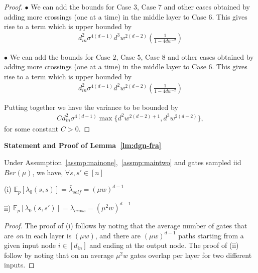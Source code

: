 \begin{proof}
$\bullet$ We can add the bounds for Case $3$, Case $7$ and other cases obtained by adding more crossings (one at a time) in the middle layer to Case $6$. This gives rise to a term which is upper bounded by 
\begin{align*}
d^2_{in}\sigma^{4(d-1)}d^3w^{2(d-2)} \left(\frac{1}{1-4dw^{-2}}\right)
\end{align*}



$\bullet$ We can add the bounds for Case $2$, Case $5$, Case $8$ and other cases obtained by adding more crossings (one at a time) in the middle layer to Case $6$. This gives rise to a term which is upper bounded by 
\begin{align*}
d^2_{in}\sigma^{4(d-1)}d^2w^{2(d-2)} \left(\frac{1}{1-4dw^{-2}}\right)
\end{align*}

Putting together we have the variance to be bounded by 
\begin{align*}
Cd^2_{in}\sigma^{4(d-1)}\max\{d^2w^{2(d-2)+1}, d^3w^{2(d-2)}\},
\end{align*}
for some constant $C>0$.
\end{proof}


\textbf{Statement and Proof of Lemma~\ref{lm:dgn-fra}}
\begin{lemma}
 Under Assumption~\ref{assmp:mainone},~\ref{assmp:maintwo} and gates sampled iid $Ber(\mu)$, we have, $\forall s,s'\in[n]$

(i) $\mathbb{E}_p\left[\lambda_0(s,s)\right]=\bar{\lambda}_{self}=(\mu w)^{d-1}$

ii) $\mathbb{E}_p\left[\lambda_0(s,s')\right]=\bar{\lambda}_{cross}= (\mu^2w)^{d-1}$
\end{lemma}

\begin{proof}
The proof of (i) follows by noting that the average number of gates that are \emph{on} in each layer is $(\mu w)$, and there are $(\mu w)^{d-1}$ paths starting from a given input node $i\in[d_{in}]$ and ending at the output node. The proof of (ii) follow by noting that on an average $\mu^2w$ gates overlap per layer for two different inputs.
\end{proof}



